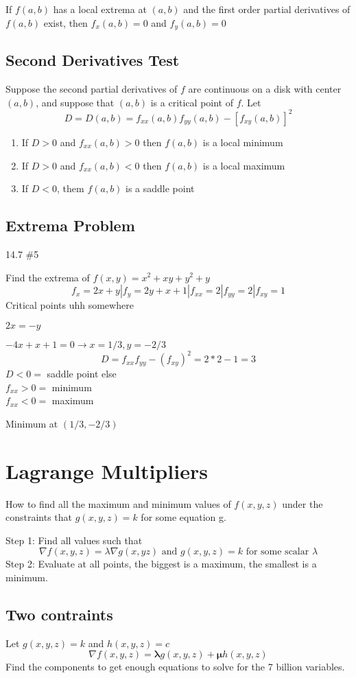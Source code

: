 \documentclass{report}
\begin{document}
If $f(a, b)$ has a local extrema at $(a, b)$ and the first order partial derivatives of $f(a, b)$ exist, then $f_x(a, b) = 0$ and $f_y(a, b) = 0$

\subsection{Second Derivatives Test}
Suppose the second partial derivatives of $f$ are continuous on a disk with center $(a, b)$, and suppose that $(a, b)$ is a critical point of $f$. Let
$$
D = D(a,b) = f_{xx}(a, b)f_{yy}(a,b) - [f_{xy}(a, b)]^2
$$
\begin{enumerate}
\item
If $D > 0$ and $f_{xx}(a, b) > 0$ then $f(a, b)$ is a local minimum
\item
If $D > 0$ and $f_{xx}(a, b) < 0$ then $f(a, b)$ is a local maximum
\item
If $D < 0$, them $f(a, b)$ is a saddle point

\end{enumerate}

\subsection{Extrema Problem}
14.7 \#5

Find the extrema of $f(x, y) = x^2 + xy + y^2 + y$
$$
f_x = 2x+y |
f_y = 2y+x+1 |
f_{xx} = 2 |
f_{yy} = 2 |
f_{xy} = 1 
$$
Critical points uhh somewhere

$2x = -y$

$-4x+x+1 = 0 \rightarrow x = 1/3, y=-2/3$
$$
D = f_{xx}f_{yy} - (f_{xy})^2 = 
2*2 - 1 = 3
$$
$D < 0 = $ saddle point else \\
$f_{xx} > 0 = $ minimum \\
$f_{xx} < 0 = $ maximum


Minimum at $(1/3, -2/3)$

\newpage
\section{Lagrange Multipliers}
How to find all the maximum and minimum values of $f(x, y, z)$ under the constraints that $g(x, y, z) = k$ for some equation g.

Step 1: Find all values such that
$$
\nabla f(x, y, z) = \lambda \nabla g(x, y z) \text{ and $g(x, y, z) = k$ for some scalar $\lambda$}
$$
Step 2: Evaluate at all points, the biggest is a maximum, the smallest is a minimum.

\subsection{Two contraints}
Let $g(x, y, z) = k$ and $h(x, y, z) = c$
$$
\nabla f(x, y, z) = \mathbf{\lambda} g(x, y, z) + \mathbf{\mu} h(x, y, z)
$$
Find the components to get enough equations to solve for the 7 billion variables.
\end{document}
